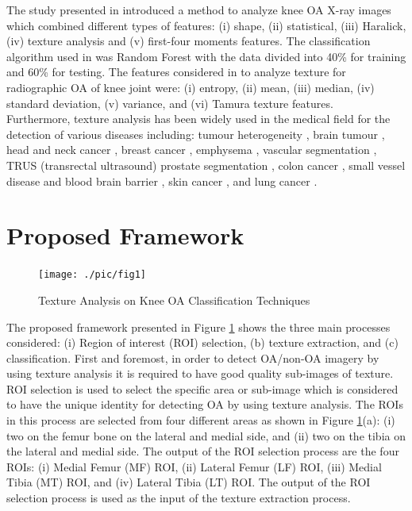 \documentclass[review]{elsarticle}
\begin{document}
The study presented in \cite{S.2016} introduced a method to analyze knee OA X-ray images which combined different types of features: (i) shape, (ii) statistical, (iii) Haralick, (iv) texture analysis and (v) first-four moments features. The classification algorithm used in \cite{S.2016} was Random Forest with the data divided into 40\% for training and 60\% for testing. The features considered in \cite{Kawathekar2015} to analyze texture for radiographic OA of knee joint were: (i) entropy, (ii) mean, (iii) median, (iv) standard deviation, (v) variance, and (vi) Tamura texture features. \\

Furthermore, texture analysis has been widely used in the medical field for the detection of various diseases including: tumour heterogeneity \cite{Liu2017, Miles2013}, brain tumour \cite{Weltens2001}, head and neck cancer \cite{Yu2009}, breast cancer \cite{Zhou2007}, emphysema \cite{Xu2006,Vasconcelos}, vascular segmentation \cite{PoddaB.2005, Ahmed2013}, TRUS (transrectal ultrasound) prostate segmentation \cite{Yuan2013, Kachouie2007}, colon cancer \cite{Esgiar2002}, small vessel disease and blood brain barrier \cite{ValdesHernandez2017}, skin cancer \cite{Ntroduction2014}, and lung cancer \cite{Pham2017}.

\section{Proposed Framework}

\begin{figure}[h!]
	\centering
	\texttt{[image: ./pic/fig1]}
	\caption{Texture Analysis on Knee OA Classification Techniques}
	\label{fig:framework}
\end{figure}

The proposed framework presented in Figure \ref{fig:framework} shows the three main processes considered: (i) Region of interest (ROI) selection, (b) texture extraction, and (c) classification. First and foremost, in order to detect OA/non-OA imagery by using texture analysis it is required to have good quality sub-images of texture. ROI selection is used to select the specific area or sub-image which is considered to have the unique identity for detecting OA by using texture analysis. The ROIs in this process are selected from four different areas as shown in Figure \ref{fig:framework}(a): (i) two on the femur bone on the lateral and medial side, and (ii) two on the tibia on the lateral and medial side. The output of the ROI selection process are the four ROIs: (i) Medial Femur (MF) ROI, (ii) Lateral Femur (LF) ROI, (iii) Medial Tibia (MT) ROI, and (iv) Lateral Tibia (LT) ROI. The output of the ROI selection process is used as the input of the texture extraction process. \\
\end{document}
